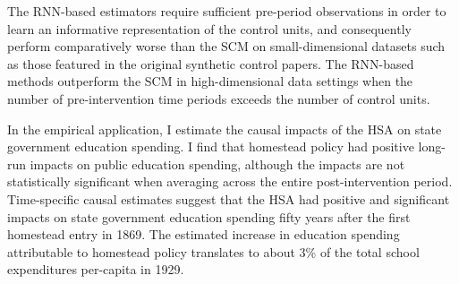 The RNN-based estimators require sufficient pre-period observations in order to learn an informative representation of the control units, and consequently perform comparatively worse than the SCM on small-dimensional datasets such as those featured in the original synthetic control papers. The RNN-based methods outperform the SCM in high-dimensional data settings when the number of pre-intervention time periods exceeds the number of control units.

In the empirical application, I estimate the causal impacts of the HSA on state government education spending. I find that homestead policy had positive long-run impacts on public education spending, although the impacts are not statistically significant when averaging across the entire post-intervention period. Time-specific causal estimates suggest that the HSA had positive and significant impacts on state government education spending fifty years after the first homestead entry in 1869. The estimated increase in education spending attributable to homestead policy translates to about 3\% of the total school expenditures per-capita in 1929.